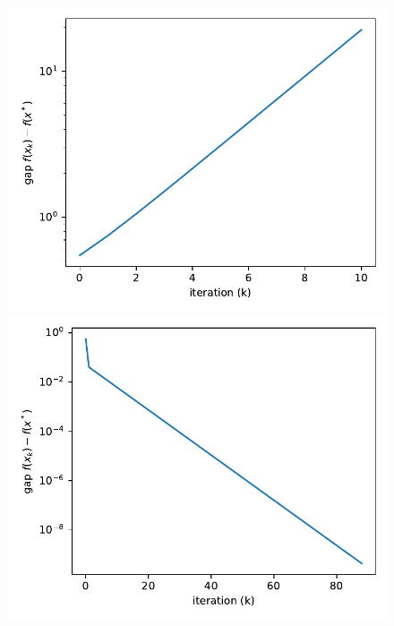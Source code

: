 \documentclass{article}
\begin{document}
\begin{enumerate}[(a).]
		\begin{figure}[h]
		\centering
		\begin{minipage}[b]{0.23\linewidth}
			\includegraphics[width=1\linewidth]{gd_f_gamma0.1_ss2.2.pdf}\vspace{4pt}
			\includegraphics[width=1\linewidth]{gd_f_gamma0.1_ss1.pdf}
		\end{minipage}
		\begin{minipage}[b]{0.23\linewidth}

\end{minipage}
\end{figure}
\end{enumerate}
\end{document}
